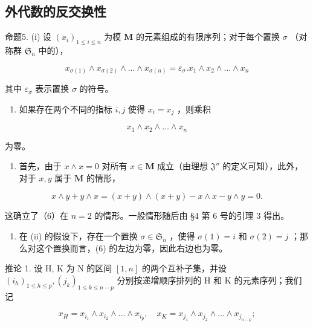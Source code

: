 \subsection{外代数的反交换性}

命题5. (i) 设 \((x_{i})_{1\leqslant i\leqslant n}\) 为模 \(\mathbf{M}\) 的元素组成的有限序列；对于每个置换 \(\sigma\) （对称群 \(\mathfrak{S}_n\) 中的），

\[
x _ {\sigma (1)} \wedge x _ {\sigma (2)} \wedge \dots \wedge x _ {\sigma (n)} = \varepsilon_ {\sigma}. x _ {1} \wedge x _ {2} \wedge \dots \wedge x _ {n}\tag{6}
\]

其中 \(\varepsilon_{\sigma}\) 表示置换 \(\sigma\) 的符号。

\begin{enumerate}
\def\labelenumi{(\roman{enumi})}
\setcounter{enumi}{1}
\tightlist
\item
  如果存在两个不同的指标 \(i, j\) 使得 \(x_{i} = x_{j}\) ，则乘积
\end{enumerate}

\[
x _ {1} \wedge x _ {2} \wedge \dots \wedge x _ {n}
\]

为零。

\begin{enumerate}
\def\labelenumi{(\roman{enumi})}
\tightlist
\item
  首先，由于 \(x \wedge x = 0\) 对所有 \(x \in \mathbf{M}\) 成立（由理想 \(\mathfrak{J}''\) 的定义可知），此外，对于 \(x, y\) 属于 \(\mathbf{M}\) 的情形，
\end{enumerate}

\[
x \wedge y + y \wedge x = (x + y) \wedge (x + y) - x \wedge x - y \wedge y = 0.
\]

这确立了（6）在 \(n = 2\) 的情形。一般情形随后由 §4 第 6 号的引理 3 得出。

\begin{enumerate}
\def\labelenumi{(\roman{enumi})}
\setcounter{enumi}{1}
\tightlist
\item
  在 (ii) 的假设下，存在一个置换 \(\sigma \in \mathfrak{S}_n\) ，使得 \(\sigma(1) = i\) 和 \(\sigma(2) = j\) ；那么对这个置换而言，(6) 的左边为零，因此右边也为零。
\end{enumerate}

推论 1. 设 H, K 为 N 的区间 \([1, n]\) 的两个互补子集，并设 \((i_{h})_{1 \leqslant h \leqslant p}, (j_{k})_{1 \leqslant k \leqslant n - p}\) 分别按递增顺序排列的 H 和 K 的元素序列；我们记

\[
x _ {H} = x _ {i _ {1}} \wedge x _ {i _ {2}} \wedge \dots \wedge x _ {i _ {p}}, \quad x _ {K} = x _ {j _ {1}} \wedge x _ {j _ {2}} \wedge \dots \wedge x _ {j _ {n - p}};
\]

